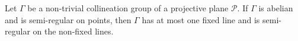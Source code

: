 Let $\Gamma$ be a non-trivial collineation group of a projective plane $\mathcal{P}$. If $\Gamma$ is abelian and is semi-regular on points, then $\Gamma$ has at most one fixed line and is semi-regular on the non-fixed lines.
